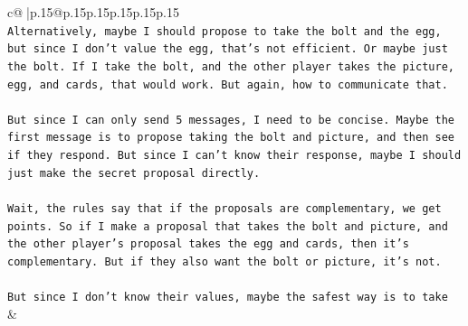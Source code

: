 \documentclass{article}
\begin{document}
{\begin{supertabular}{c@{$\;$}|p{.15\linewidth}@{}p{.15\linewidth}p{.15\linewidth}p{.15\linewidth}p{.15\linewidth}p{.15\linewidth}}
{{{\\ 
\texttt{Alternatively, maybe I should propose to take the bolt and the egg, but since I don't value the egg, that's not efficient. Or maybe just the bolt. If I take the bolt, and the other player takes the picture, egg, and cards, that would work. But again, how to communicate that.} \\
\\ 
\texttt{But since I can only send 5 messages, I need to be concise. Maybe the first message is to propose taking the bolt and picture, and then see if they respond. But since I can't know their response, maybe I should just make the secret proposal directly.} \\
\\ 
\texttt{Wait, the rules say that if the proposals are complementary, we get points. So if I make a proposal that takes the bolt and picture, and the other player's proposal takes the egg and cards, then it's complementary. But if they also want the bolt or picture, it's not. } \\
\\ 
\texttt{But since I don't know their values, maybe the safest way is to take} \\
            }
        }
    }
    & \\ \\


\end{supertabular}}
\end{document}
